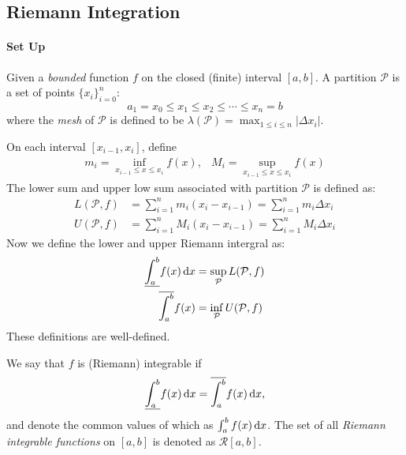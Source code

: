 \subsection{Riemann Integration}
\paragraph{Set Up}
Given a \emph{bounded} function $f$ on the closed (finite) interval $[a,b]$. A partition $\mathcal{P}$ is a set of points $\{x_i\}_{i=0}^n$:
\[
a_1=x_0\le x_1\le x_2\le\cdots\le x_n=b
\]
where the \emph{mesh} of $\mathcal{P}$ is defined to be $\lambda(\mathcal{P})=\max_{1\le i\le n}|\Delta x_i|$.

On each interval $[x_{i-1},x_i]$, define 
\[
\begin{array}{ll}
m_i=\inf_{x_{i-1}\le x\le x_i}f(x),
&
M_i=\sup_{x_{i-1}\le x\le x_i}f(x)
\end{array}
\]
The lower sum and upper low sum associated with partition $\mathcal{P}$ is defined as:
\begin{align*}
L(\mathcal{P},f)&=\sum_{i=1}^{n} m_i(x_i - x_{i-1})
=\sum_{i=1}^n m_i\Delta x_i\\
U(\mathcal{P},f)&=\sum_{i=1}^{n} M_i(x_i - x_{i-1})
=\sum_{i=1}^n M_i\Delta x_i
\end{align*}
Now we define the lower and upper Riemann intergral as:
\begin{align*}
\underline{\int_{a}^{b}}f(x)\,\mathrm{d} x&=\sup_{\mathcal{P}}L(\mathcal{P},f)\\
\overline{\int_{a}^{b}}f(x)&=\inf_{\mathcal{P}}U(\mathcal{P},f)
\end{align*}
These definitions are well-defined.
\begin{definition}[integrable]
We say that $f$ is (Riemann) integrable if \[\underline{\int_{a}^{b}}f(x)\,\mathrm{d} x=\overline{\int_{a}^{b}}f(x)\,\mathrm{d} x,\] and denote the common values of which as $\int_a^bf(x)\,\mathrm{d} x$. The set of all \emph{Riemann integrable functions} on $[a,b]$ is denoted as $\mathcal{R}[a,b]$.
\end{definition}
